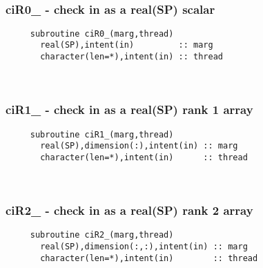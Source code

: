  
\mbox{}\hrulefill\ 
 
  \subsubsection{ciR0\_ - check in as a real(SP) scalar}

\begin{verbatim} 
     subroutine ciR0_(marg,thread)
       real(SP),intent(in)         :: marg
       character(len=*),intent(in) :: thread
 \end{verbatim}%
 
 
\mbox{}\hrulefill\ 
 
  \subsubsection{ciR1\_ - check in as a real(SP) rank 1 array}

\begin{verbatim} 
     subroutine ciR1_(marg,thread)
       real(SP),dimension(:),intent(in) :: marg
       character(len=*),intent(in)      :: thread
 \end{verbatim}%
 
 
\mbox{}\hrulefill\ 
 
  \subsubsection{ciR2\_ - check in as a real(SP) rank 2 array}

\begin{verbatim} 
     subroutine ciR2_(marg,thread)
       real(SP),dimension(:,:),intent(in) :: marg
       character(len=*),intent(in)        :: thread
 \end{verbatim}%
 
